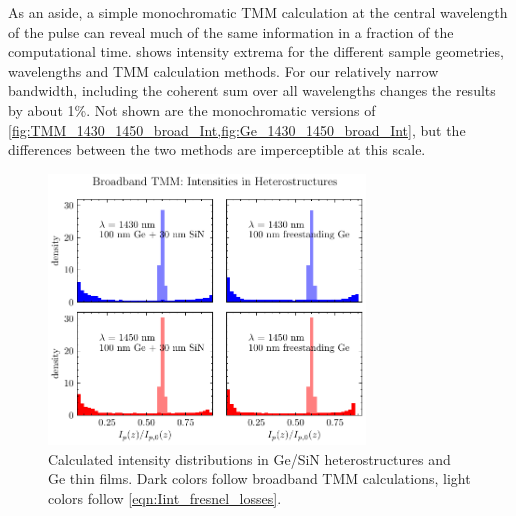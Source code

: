 
As an aside, a simple monochromatic TMM calculation at the central wavelength of the pulse can reveal much of the same information in a fraction of the computational time.  shows intensity extrema for the different sample geometries, wavelengths and TMM calculation methods. For our relatively narrow bandwidth, including the coherent sum over all wavelengths changes the results by about 1\%. Not shown are the monochromatic versions of \cref{fig:TMM_1430_1450_broad_Int,fig:Ge_1430_1450_broad_Int}, but the differences between the two methods are imperceptible at this scale.

\begin{figure}
	\centering
	\includegraphics[width=0.75\textwidth]{figures/chap4/TMM_hist_chrom_int_2x2.pdf}
	\caption{Calculated intensity distributions in Ge/SiN heterostructures and Ge thin films. Dark colors follow broadband TMM calculations, light colors follow \cref{eqn:Iint_fresnel_losses}.}
	\label{fig:TMM_hist_chrom_int_2x2}
\end{figure}


